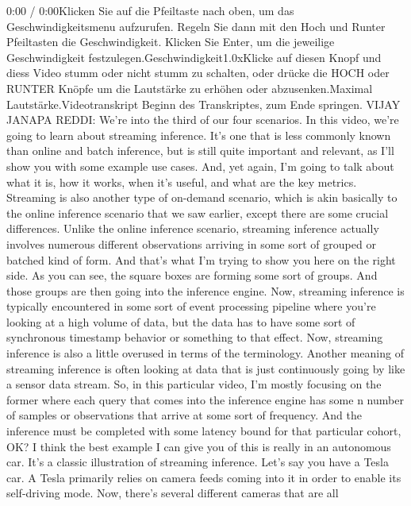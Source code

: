 {{{{{{{    0:00 / 0:00Klicken Sie auf die Pfeiltaste nach oben, um das Geschwindigkeitsmenu aufzurufen. Regeln Sie dann mit den Hoch und Runter Pfeiltasten die Geschwindigkeit. Klicken Sie Enter, um die jeweilige Geschwindigkeit festzulegen.Geschwindigkeit1.0xKlicke auf diesen Knopf und diess Video stumm oder nicht stumm zu schalten, oder drücke die HOCH oder RUNTER Knöpfe um die Lautstärke zu erhöhen oder abzusenken.Maximal Lautstärke.Videotranskript
    Beginn des Transkriptes, zum Ende springen.
    VIJAY JANAPA REDDI: We're into the third of our four scenarios.
    In this video, we're going to learn about streaming inference.
    It's one that is less commonly known than online and batch inference,
    but is still quite important and relevant,
    as I'll show you with some example use cases.
    And, yet again, I'm going to talk about what it is, how it works,
    when it's useful, and what are the key metrics.
    Streaming is also another type of on-demand scenario, which
    is akin basically to the online inference scenario
    that we saw earlier, except there are some crucial differences.
    Unlike the online inference scenario, streaming inference actually
    involves numerous different observations arriving
    in some sort of grouped or batched kind of form.
    And that's what I'm trying to show you here on the right side.
    As you can see, the square boxes are forming some sort of groups.
    And those groups are then going into the inference engine.
    Now, streaming inference is typically encountered
    in some sort of event processing pipeline where you're
    looking at a high volume of data, but the data
    has to have some sort of synchronous timestamp behavior or something
    to that effect.
    Now, streaming inference is also a little
    overused in terms of the terminology.
    Another meaning of streaming inference is often
    looking at data that is just continuously going
    by like a sensor data stream.
    So, in this particular video, I'm mostly focusing on the former
    where each query that comes into the inference engine
    has some n number of samples or observations
    that arrive at some sort of frequency.
    And the inference must be completed with some latency bound
    for that particular cohort, OK?
    I think the best example I can give you of this is really in an autonomous car.
    It's a classic illustration of streaming inference.
    Let's say you have a Tesla car.
    A Tesla primarily relies on camera feeds coming into it in order
    to enable its self-driving mode.
    Now, there's several different cameras that are all
}}}}}}}
